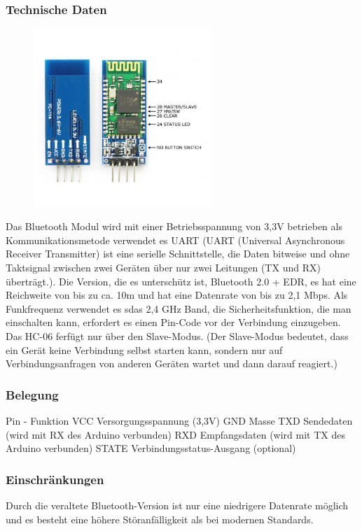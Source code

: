 \subsubsection{Technische Daten}
\begin{figure}[H]
    \includegraphics[width=0.6\textwidth, center]{img/Hardware/hc06.png}
\end{figure}
Das Bluetooth Modul wird mit einer Betriebsspannung von 3,3V betrieben als Kommunikationsmetode verwendet es UART 
(UART (Universal Asynchronous Receiver Transmitter) ist eine serielle Schnittstelle, die Daten bitweise und ohne Taktsignal zwischen zwei Geräten über nur zwei Leitungen (TX und RX) überträgt.).  
Die Version, die es unterschütz ist, Bluetooth 2.0 + EDR, es hat eine Reichweite von bis zu ca.  10m und hat eine Datenrate von bis zu 2,1 Mbps. 
Als Funkfrequenz verwendet es sdas 2,4 GHz Band, die Sicherheitsfunktion, die man einschalten kann, erfordert es einen Pin-Code vor der Verbindung einzugeben. 
Das HC-06 ferfügt nur über den Slave-Modus. 
(Der Slave-Modus bedeutet, dass ein Gerät keine Verbindung selbst starten kann, sondern nur auf Verbindungsanfragen von anderen Geräten wartet und dann darauf reagiert.)
\subsubsection{Belegung}
Pin	-	Funktion
VCC	Versorgungsspannung (3,3V)
GND	Masse
TXD	Sendedaten (wird mit RX des Arduino verbunden)
RXD	Empfangsdaten (wird mit TX des Arduino verbunden)
STATE	Verbindungsstatus-Ausgang (optional)

\subsubsection{Einschränkungen}
Durch die veraltete Bluetooth-Version ist nur eine niedrigere Datenrate möglich und es besteht eine höhere Störanfälligkeit als bei modernen Standards.
%

